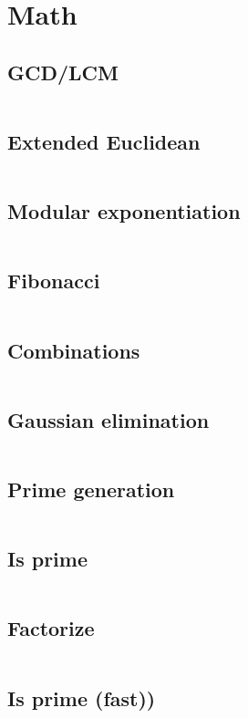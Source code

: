 \section{Math}
\subsection{GCD/LCM}
\inputminted[frame=single,framesep=3pt,tabsize=2,breaklines=true,linenos,label=O(log(K))]{c++}{math/gcd.cpp}

\subsection{Extended Euclidean}
\inputminted[frame=single,framesep=3pt,tabsize=2,breaklines=true,linenos,label=O(log(K))]{c++}{math/extgcd.cpp}

\subsection{Modular exponentiation}
\inputminted[frame=single,framesep=3pt,tabsize=2,breaklines=true,linenos,label=O(log(K))]{c++}{math/expmod.cpp}

\subsection{Fibonacci}
\inputminted[frame=single,framesep=3pt,tabsize=2,breaklines=true,linenos,label=O(N)]{c++}{math/fib.cpp}

\subsection{Combinations}
\inputminted[frame=single,framesep=3pt,tabsize=2,breaklines=true,linenos,label=O($N^2$)]{c++}{math/combinations.cpp}

\subsection{Gaussian elimination}
\inputminted[frame=single,framesep=3pt,breaklines=true,tabsize=2,linenos,label=O($N^3$)]{c++}{math/gaussian-elimination.cpp}

\subsection{Prime generation}
\inputminted[frame=single,framesep=3pt,tabsize=2,breaklines=true,linenos,label=O(N log(log(N)))]{c++}{math/prime-gen.cpp}

\subsection{Is prime}
\inputminted[frame=single,framesep=3pt,tabsize=2,breaklines=true,linenos,label=O(sqrt(N))]{c++}{math/is-prime.cpp}

\subsection{Factorize}
\inputminted[frame=single,framesep=3pt,tabsize=2,breaklines=true,linenos,label=O(N log(log(N)))]{c++}{math/factorize.cpp}

\subsection{Is prime (fast))}
\inputminted[frame=single,framesep=3pt,tabsize=2,breaklines=true,linenos,label=O(polylog(N))]{c++}{math/is-prime-fast.cpp}